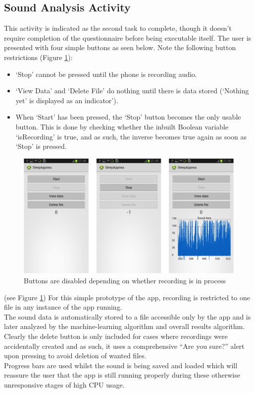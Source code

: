 \subsection{Sound Analysis Activity}
This activity is indicated as the second task to complete, though it doesn’t require completion of the questionnaire before being executable itself. The user is presented with four simple buttons as seen below. Note the following button restrictions (Figure \ref{fig:recordPages}):
\begin{itemize}
\item `Stop' cannot be pressed until the phone is recording audio.
\item `View Data' and ‘Delete File’ do nothing until there is data stored (‘Nothing yet’ is displayed as an indicator’).
\item When `Start' has been pressed, the ‘Stop’ button becomes the only usable button. This is done by checking whether the inbuilt Boolean variable ‘isRecording’ is true, and as such, the inverse becomes true again as soon as ‘Stop’ is pressed.
\end{itemize}
\begin{figure}[ht!]
		\centering
			\includegraphics[width=.9\textwidth]{drawings/Audiorecord_struct.png}
		\caption{Buttons are disabled depending on whether recording is in process}
		\label{fig:recordPages}
	\end{figure}
(see Figure \ref{fig:recordPages})
For this simple prototype of the app, recording is restricted to one file in any instance of the app running.
\\ The sound data is automatically stored to a file accessible only by the app and is later analyzed by the machine-learning algorithm and overall results algorithm. Clearly the delete button is only included for cases where recordings were accidentally created and as such, it uses a comprehensive ``Are you sure?'' alert upon pressing to avoid deletion of wanted files.
\\Progress bars are used whilst the sound is being saved and loaded which will reassure the user that the app is still running properly during these otherwise unresponsive stages of high CPU usage. 
